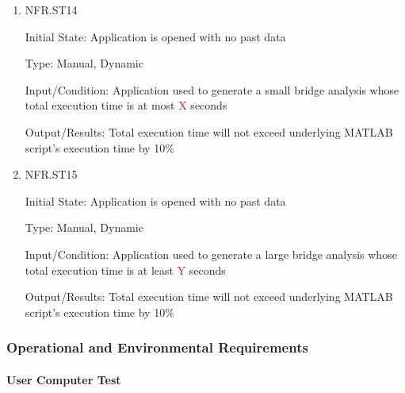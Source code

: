 \documentclass[12pt, titlepage]{article}
\begin{document}
\begin{enumerate}

\item{NFR.ST14\\}

Initial State: Application is opened with no past data

Type: Manual, Dynamic

Input/Condition: Application used to generate a small bridge analysis whose total execution time is at most \textcolor{red}{X} seconds

Output/Results: Total execution time will not exceed underlying MATLAB script's execution time by 10\%

\item{NFR.ST15\\}

Initial State: Application is opened with no past data

Type: Manual, Dynamic

Input/Condition: Application used to generate a large bridge analysis whose total execution time is at least \textcolor{red}{Y} seconds

Output/Results: Total execution time will not exceed underlying MATLAB script's execution time by 10\%

\end{enumerate}

\subsubsection{Operational and Environmental Requirements}
		
\paragraph{User Computer Test}
\end{document}
